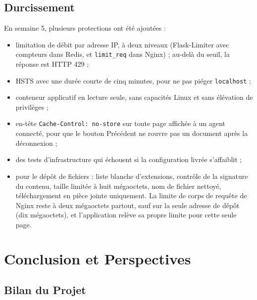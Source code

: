 \documentclass[12pt,a4paper]{report}
\newcommand{\code}[1]{\texttt{\NoAutoSpacing #1}}
\begin{document}
\section{Durcissement}

En semaine 5, plusieurs protections ont été ajoutées :
\begin{itemize}
  \item limitation de débit par adresse IP, à deux niveaux (Flask-Limiter avec compteurs dans Redis, et \code{limit\_req} dans Nginx) ; au-delà du seuil, la réponse est HTTP 429 ;
  \item HSTS avec une durée courte de cinq minutes, pour ne pas piéger \code{localhost} ;
  \item conteneur applicatif en lecture seule, sans capacités Linux et sans élévation de privilèges ;
  \item en-tête \code{Cache-Control: no-store} sur toute page affichée à un agent connecté, pour que le bouton \og Précédent \fg{} ne rouvre pas un document après la déconnexion ;
  \item des tests d'infrastructure qui échouent si la configuration livrée s'affaiblit ;
  \item pour le dépôt de fichiers : liste blanche d'extensions, contrôle de la signature du contenu, taille limitée à huit mégaoctets, nom de fichier nettoyé, téléchargement en pièce jointe uniquement. La limite de corps de requête de Nginx reste à deux mégaoctets partout, sauf sur la seule adresse de dépôt (dix mégaoctets), et l'application relève sa propre limite pour cette seule page.
\end{itemize}

\chapter{Conclusion et Perspectives}

\section{Bilan du Projet}
\end{document}
